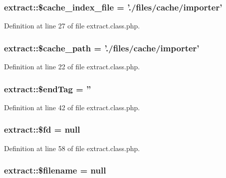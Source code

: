 \hypertarget{classextract_a6bd40f89eeb4e608723a39f5824d0c1e}{
\subsubsection[{\$cache\-\_\-index\-\_\-file}]{\setlength{\rightskip}{0pt plus 5cm}extract\-::\$cache\-\_\-index\-\_\-file = './files/cache/{\bf importer}'}}\label{classextract_a6bd40f89eeb4e608723a39f5824d0c1e}


Definition at line 27 of file extract.\-class.\-php.

\hypertarget{classextract_a00f1309c1e975d137a9f17ad9afc5d1e}{
\subsubsection[{\$cache\-\_\-path}]{\setlength{\rightskip}{0pt plus 5cm}extract\-::\$cache\-\_\-path = './files/cache/{\bf importer}'}}\label{classextract_a00f1309c1e975d137a9f17ad9afc5d1e}


Definition at line 22 of file extract.\-class.\-php.

\hypertarget{classextract_a46190b1f23addca9726e18aa15929c2a}{
\subsubsection[{\$end\-Tag}]{\setlength{\rightskip}{0pt plus 5cm}extract\-::\$end\-Tag = ''}}\label{classextract_a46190b1f23addca9726e18aa15929c2a}


Definition at line 42 of file extract.\-class.\-php.

\hypertarget{classextract_ae21a224916b245a23dd69139f58c81ed}{
\subsubsection[{\$fd}]{\setlength{\rightskip}{0pt plus 5cm}extract\-::\$fd = null}}\label{classextract_ae21a224916b245a23dd69139f58c81ed}


Definition at line 58 of file extract.\-class.\-php.

\hypertarget{classextract_abec232df6889e57dd327ddf132799f4c}{
\subsubsection[{\$filename}]{\setlength{\rightskip}{0pt plus 5cm}extract\-::\$filename = null}}\label{classextract_abec232df6889e57dd327ddf132799f4c}



